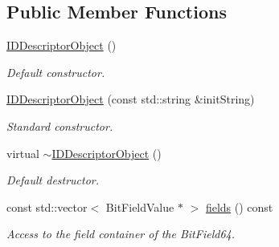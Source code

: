 \subsection*{Public Member Functions}
\begin{DoxyCompactItemize}
\item 
\hyperlink{class_d_d4hep_1_1_geometry_1_1_i_d_descriptor_object_a42a00825ff023bcce96505e616599e94}{IDDescriptorObject} ()
\begin{DoxyCompactList}\small\item\em Default constructor. \item\end{DoxyCompactList}\item 
\hyperlink{class_d_d4hep_1_1_geometry_1_1_i_d_descriptor_object_a9255ad3ebfdcc22225b2ca01cfd99442}{IDDescriptorObject} (const std::string \&initString)
\begin{DoxyCompactList}\small\item\em Standard constructor. \item\end{DoxyCompactList}\item 
virtual \hyperlink{class_d_d4hep_1_1_geometry_1_1_i_d_descriptor_object_ab2e22dcf33d24f258e82973d9851474d}{$\sim$IDDescriptorObject} ()
\begin{DoxyCompactList}\small\item\em Default destructor. \item\end{DoxyCompactList}\item 
const std::vector$<$ BitFieldValue $\ast$ $>$ \hyperlink{class_d_d4hep_1_1_geometry_1_1_i_d_descriptor_object_abdc7d5f4bfdcdc6d7ed8e1fcb42456a9}{fields} () const 
\begin{DoxyCompactList}\small\item\em Access to the field container of the BitField64. \item\end{DoxyCompactList}\end{DoxyCompactItemize}
